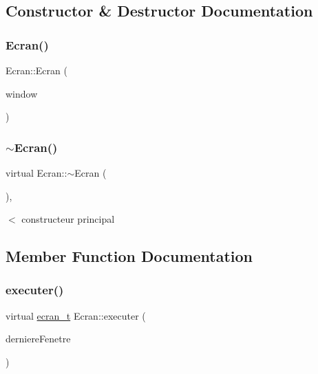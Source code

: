 \subsection{Constructor \& Destructor Documentation}
\mbox{\label{class_ecran_a2ea4e1f23da32177ec9a1e4d02e87b46}} 
\subsubsection{\texorpdfstring{Ecran()}{Ecran()}}
{\footnotesize\ttfamily Ecran\+::\+Ecran (\begin{DoxyParamCaption}\item[{sf\+::\+Render\+Window \&}]{window }\end{DoxyParamCaption})\hspace{0.3cm}{\ttfamily [explicit]}}

\mbox{\label{class_ecran_a00e529f95c3832a06f2d46b797d76072}} 
\subsubsection{\texorpdfstring{$\sim$\+Ecran()}{~Ecran()}}
{\footnotesize\ttfamily virtual Ecran\+::$\sim$\+Ecran (\begin{DoxyParamCaption}{ }\end{DoxyParamCaption})\hspace{0.3cm}{\ttfamily [virtual]}, {\ttfamily [default]}}



$<$ constructeur principal 



\subsection{Member Function Documentation}
\mbox{\label{class_ecran_a764dadf20079744d3f5dd633eae268cc}} 
\subsubsection{\texorpdfstring{executer()}{executer()}}
{\footnotesize\ttfamily virtual \mbox{\hyperlink{constantes_8h_a33e4f15dde10f34860a6b35be343ae56}{ecran\+\_\+t}} Ecran\+::executer (\begin{DoxyParamCaption}\item[{sf\+::\+Texture \&}]{derniere\+Fenetre }\end{DoxyParamCaption})\hspace{0.3cm}{\ttfamily [pure virtual]}}



